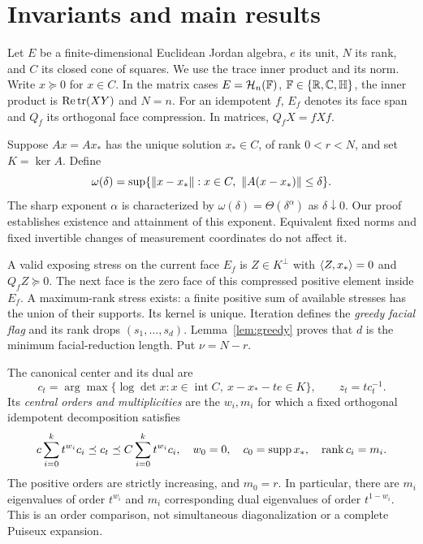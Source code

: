 \section{Invariants and main results}\label{sec:statements}
Let $E$ be a finite-dimensional Euclidean Jordan algebra, $e$ its unit, $N$ its rank, and $C$ its closed cone of squares. We use the trace inner product and its norm. Write $x\succeq0$ for $x\in C$. In the matrix cases $E=\mathcal H_n(\mathbb F)$, $\mathbb F\in\{\mathbb R,\mathbb C,\mathbb H\}$, the inner product is $\operatorname{Re}\operatorname{tr}(XY)$ and $N=n$. For an idempotent $f$, $E_f$ denotes its face span and $Q_f$ its orthogonal face compression. In matrices, $Q_fX=fXf$.

Suppose $Ax=Ax_*$ has the unique solution $x_*\in C$, of rank $0<r<N$, and set $K=\ker A$. Define
\begin{equation}\label{eq:modulus}
\omega(\delta)=\sup\{\norm{x-x_*}:x\in C,\ \norm{A(x-x_*)}\le\delta\}.
\end{equation}
The sharp exponent $\alpha$ is characterized by $\omega(\delta)=\Theta(\delta^\alpha)$ as $\delta\downarrow0$. Our proof establishes existence and attainment of this exponent. Equivalent fixed norms and fixed invertible changes of measurement coordinates do not affect it.

A valid exposing stress on the current face $E_f$ is $Z\in K^\perp$ with $\langle Z,x_*\rangle=0$ and $Q_fZ\succeq0$. The next face is the zero face of this compressed positive element inside $E_f$. A maximum-rank stress exists: a finite positive sum of available stresses has the union of their supports. Its kernel is unique. Iteration defines the \emph{greedy facial flag} and its rank drops $(s_1,\ldots,s_d)$. Lemma~\ref{lem:greedy} proves that $d$ is the minimum facial-reduction length. Put $\nu=N-r$.

The canonical center and its dual are
\begin{equation}\label{eq:center}
 c_t=\arg\max\{\log\det x:x\in\operatorname{int}C,\ x-x_*-te\in K\},
 \qquad z_t=t c_t^{-1}.
\end{equation}
Its \emph{central orders and multiplicities} are the $w_i,m_i$ for which a fixed orthogonal idempotent decomposition satisfies
\begin{equation}\label{eq:chart-statement}
 c\sum_{i=0}^k t^{w_i}c_i\preceq c_t\preceq C\sum_{i=0}^k t^{w_i}c_i,
 \quad w_0=0,\quad c_0=\operatorname{supp} x_*,\quad \operatorname{rank} c_i=m_i.
\end{equation}
The positive orders are strictly increasing, and $m_0=r$. In particular, there are $m_i$ eigenvalues of order $t^{w_i}$ and $m_i$ corresponding dual eigenvalues of order $t^{1-w_i}$. This is an order comparison, not simultaneous diagonalization or a complete Puiseux expansion.

